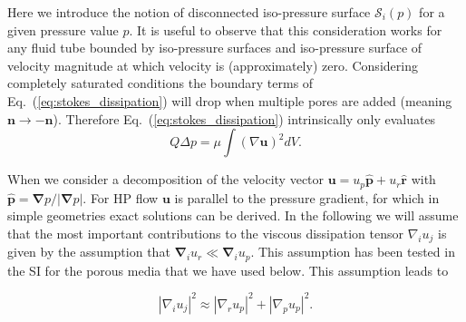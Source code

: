 \documentclass[draft]{agujournal2019}
\begin{document}
Here we introduce the notion of disconnected iso-pressure surface $\mathcal{S}_i(p)$ for a given pressure value $p$.
It is useful to observe that this consideration works for any fluid tube bounded by iso-pressure surfaces and iso-pressure surface of velocity magnitude at which velocity is (approximately) zero. Considering completely saturated conditions the boundary terms of Eq.~(\ref{eq:stokes_dissipation}) will drop when multiple pores are added (meaning $\mathbf{n}\rightarrow -\mathbf{n}$). Therefore Eq.~(\ref{eq:stokes_dissipation}) intrinsically only evaluates
\begin{equation}
Q \Delta p=\mu\int (\nabla \mathbf{u})^2 dV.\label{eq:pore_based_energy_dissipation}
\end{equation}

When we consider a decomposition of the velocity vector  $\mathbf{u} = u_p \mathbf{\hat{p}} + u_r \mathbf{\hat{r}}$ with $\mathbf{\hat{p}} =\mathbf{ \nabla}p/|\mathbf{ \nabla}p|$. For HP flow $\mathbf{u}$ is parallel to the pressure gradient, for which in simple geometries exact solutions can be derived. In the following we will assume that the most important contributions to the viscous dissipation tensor $\nabla_i u_j$ is given by the assumption that $\mathbf{\nabla}_i u_r \ll \mathbf{\nabla}_i u_p $. This assumption has been tested in the SI for the porous media that we have used below. This assumption leads to 

\begin{equation}
\left|\nabla_i u_j\right|^2 \approx  \left|\nabla_r u_p\right|^2 + \left|\nabla_p u_p\right|^2 .\label{eq:reduced_dissipation_tensor}
\end{equation}
\end{document}
